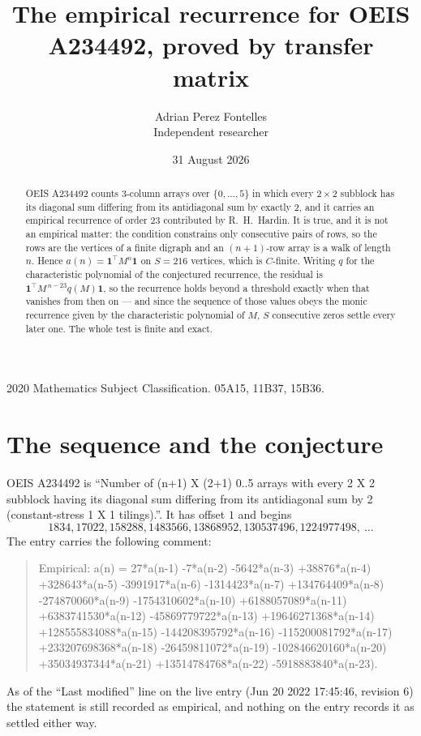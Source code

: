 \documentclass[11pt,a4paper]{article}
\title{The empirical recurrence for OEIS A234492, proved by transfer matrix}
\author{Adrian Perez Fontelles\\ \small Independent researcher}
\date{31 August 2026}
\theoremstyle{plain}
\theoremstyle{definition}
\begin{document}
\maketitle

\begin{abstract}
OEIS A234492 counts $3$-column arrays over $\{0,\dots,5\}$ in which every
$2\times2$ subblock has its diagonal sum differing from its antidiagonal sum by
exactly $2$, and it
carries an empirical recurrence of order $23$ contributed by R.~H.~Hardin. It is true,
and it is not an empirical matter: the condition constrains only consecutive pairs of rows,
so the rows are the vertices of a finite digraph and an $(n+1)$-row array is a walk of
length $n$. Hence $a(n)=\mathbf{1}^{\!\top}M^{n}\mathbf{1}$ on $S=216$ vertices, which
is $C$-finite. Writing $q$ for the characteristic polynomial of the conjectured recurrence,
the residual is $\mathbf{1}^{\!\top}M^{\,n-23}q(M)\mathbf{1}$, so the recurrence
holds beyond a threshold exactly when that vanishes from then on --- and since the sequence
of those values obeys the monic recurrence given by the characteristic polynomial of $M$,
$S$ consecutive zeros settle every later one. The whole test is finite and exact.
\end{abstract}

\noindent\small 2020 Mathematics Subject Classification. 05A15, 11B37, 15B36.\normalsize

\section{The sequence and the conjecture}

OEIS A234492 is ``Number of (n+1) X (2+1) 0..5 arrays with every 2 X 2 subblock having its diagonal sum differing from its antidiagonal sum by 2 (constant-stress 1 X 1 tilings).''. It has offset
$1$ and begins
\[
1834, 17022, 158288, 1483566, 13868952, 130537496, 1224977498,\ \dots
\]
The entry carries the following comment:
\begin{quote}\small
Empirical: a(n) = 27*a(n-1) -7*a(n-2) -5642*a(n-3) +38876*a(n-4) +328643*a(n-5) -3991917*a(n-6) -1314423*a(n-7) +134764409*a(n-8) -274870060*a(n-9) -1754310602*a(n-10) +6188057089*a(n-11) +6383741530*a(n-12) -45869779722*a(n-13) +19646271368*a(n-14) +128555834088*a(n-15) -144208395792*a(n-16) -115200081792*a(n-17) +233207698368*a(n-18) -26459811072*a(n-19) -102846620160*a(n-20) +35034937344*a(n-21) +13514784768*a(n-22) -5918883840*a(n-23).
\end{quote}
As of the ``Last modified'' line on the live entry (Jun 20 2022 17:45:46, revision 6) the statement is
still recorded as empirical, and nothing on the entry records it as settled either way.
\end{document}
